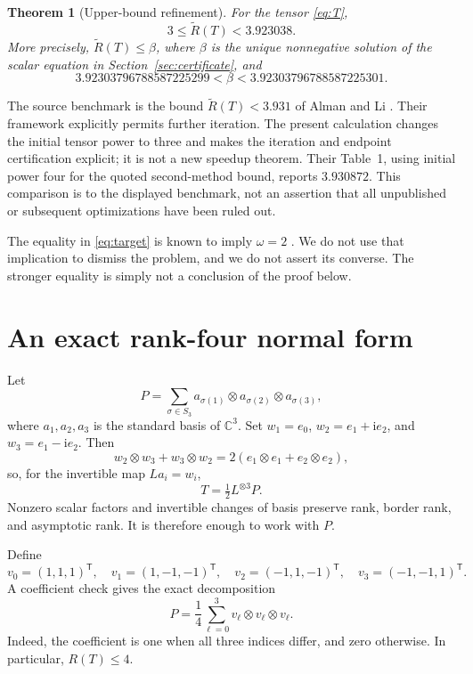 \documentclass[11pt]{article}
\newcommand{\AR}{\widetilde{R}}
\newcommand{\C}{\mathbb C}
\newtheorem{theorem}{Theorem}[section]
\theoremstyle{definition}\newtheorem{definition}[theorem]{Definition}
\theoremstyle{remark}\newtheorem{remark}[theorem]{Remark}
\begin{document}
\begin{theorem}[Upper-bound refinement]\label{thm:main}
For the tensor \eqref{eq:T},
\[
\boxed{\qquad 3\leq\AR(T)<3.923038.\qquad}
\]
More precisely, $\AR(T)\leq\beta$, where $\beta$ is the unique nonnegative solution
of the scalar equation in Section~\ref{sec:certificate}, and
\[
3.92303796788587225299<\beta<3.92303796788587225301.
\]
\end{theorem}

The source benchmark is the bound $\AR(T)<3.931$ of Alman and Li
\cite{alman}. Their framework explicitly permits further iteration. The present
calculation changes the initial tensor power to three and makes the iteration
and endpoint certification explicit; it is not a new speedup theorem.
Their Table~1, using initial power four for the quoted second-method bound,
reports $3.930872$. This comparison is to the displayed benchmark, not an
assertion that all unpublished or subsequent optimizations have been ruled out.

The equality in \eqref{eq:target} is known to imply $\omega=2$
\cite[Theorem 1.2]{alman}. We do not use that implication to dismiss the problem,
and we do not assert its converse. The stronger equality is simply not a
conclusion of the proof below.

\section{An exact rank-four normal form}
Let
\[
P=\sum_{\sigma\in S_3}
 a_{\sigma(1)}\otimes a_{\sigma(2)}\otimes a_{\sigma(3)},
\]
where $a_1,a_2,a_3$ is the standard basis of $\C^3$.
Set $w_1=e_0$, $w_2=e_1+\mathrm i e_2$, and $w_3=e_1-\mathrm i e_2$.
Then
\[
w_2\otimes w_3+w_3\otimes w_2
=2(e_1\otimes e_1+e_2\otimes e_2),
\]
so, for the invertible map $L a_i=w_i$,
\begin{equation}\label{eq:normal}
T=\tfrac12L^{\otimes3}P.
\end{equation}
Nonzero scalar factors and invertible changes of basis preserve rank, border
rank, and asymptotic rank. It is therefore enough to work with $P$.

Define
\[
v_0=(1,1,1)^\mathsf T,\quad v_1=(1,-1,-1)^\mathsf T,\quad
v_2=(-1,1,-1)^\mathsf T,\quad v_3=(-1,-1,1)^\mathsf T.
\]
A coefficient check gives the exact decomposition
\begin{equation}\label{eq:rankfour}
P=\frac14\sum_{\ell=0}^3v_\ell\otimes v_\ell\otimes v_\ell.
\end{equation}
Indeed, the coefficient is one when all three indices differ, and zero
otherwise. In particular, $R(T)\leq4$.
\end{document}
